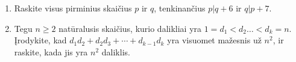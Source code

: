 \begin{enumerate}
  \item \text{[Ireland 2007]} Raskite visus pirminius skaičius $p$ ir
    $q$, tenkinančius $p|q+6$ ir $q|p+7$.
  \item \text{[IMO 2002]} Tegu $n\geq 2$ natūralusis skaičius, kurio
    dalikliai yra $1=d_1 < d_2 \dots < d_k =n$. Įrodykite, kad $d_1 d_2 +
    d_2 d_3 + \cdots + d_{k-1}d_{k}$ yra visuomet mažesnis už $n^2$, ir
    raskite, kada jis yra $n^2$ daliklis.
\end{enumerate}


